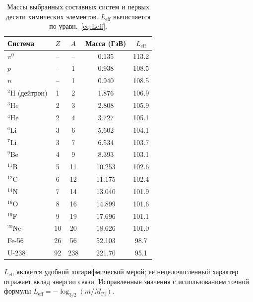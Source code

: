 \documentclass[11pt,a4paper]{article}
\begin{document}
	\begin{table}[H]
		\centering
		\caption{Массы выбранных составных систем и первых десяти химических элементов. \(L_{\mathrm{eff}}\) вычисляется по уравн.~\eqref{eq:Leff}.}
		\label{tab:composite}
		\small
		\begin{tabular}{l c c c c}
			\toprule
			Система & \(Z\) & \(A\) & Масса (ГэВ) & \(L_{\mathrm{eff}}\) \\
			\midrule
			\(\pi^0\) & – & – & 0.135 & 113.2 \\
			\(p\) & – & 1 & 0.938 & 108.5 \\
			\(n\) & – & 1 & 0.940 & 108.5 \\
			\(^2\)H (дейтрон) & 1 & 2 & 1.876 & 106.9 \\
			\(^3\)He & 2 & 3 & 2.808 & 105.9 \\
			\(^4\)He & 2 & 4 & 3.727 & 105.1 \\
			\(^6\)Li & 3 & 6 & 5.602 & 104.1 \\
			\(^7\)Li & 3 & 7 & 6.534 & 103.7 \\
			\(^9\)Be & 4 & 9 & 8.393 & 103.1 \\
			\(^{11}\)B & 5 & 11 & 10.253 & 102.6 \\
			\(^{12}\)C & 6 & 12 & 11.175 & 102.4 \\
			\(^{14}\)N & 7 & 14 & 13.040 & 101.9 \\
			\(^{16}\)O & 8 & 16 & 14.899 & 101.6 \\
			\(^{19}\)F & 9 & 19 & 17.696 & 101.1 \\
			\(^{20}\)Ne & 10 & 20 & 18.626 & 101.0 \\
			Fe-56 & 26 & 56 & 52.103 & 98.7 \\
			U-238 & 92 & 238 & 221.70 & 95.1 \\
			\bottomrule
		\end{tabular}
		\par\smallskip
		\footnotesize \(L_{\mathrm{eff}}\) является удобной логарифмической мерой; ее нецелочисленный характер отражает вклад энергии связи. Исправленные значения с использованием точной формулы \(L_{\mathrm{eff}} = -\log_{3/2}(m/M_{\mathrm{Pl}})\).
	\end{table}
	
\end{document}
